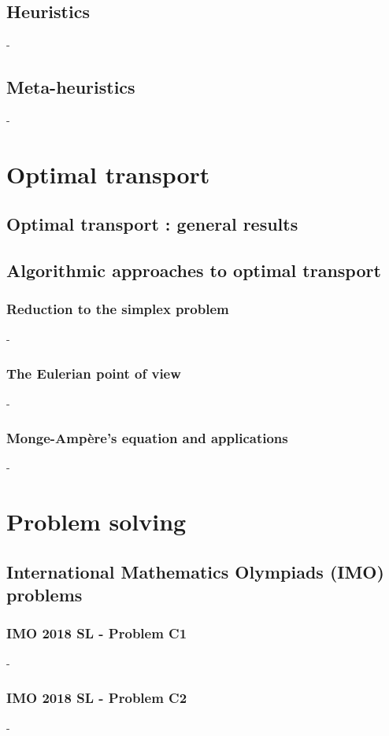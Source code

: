 \documentclass[12pt,openany,oneside]{book}
\theoremstyle{definition}
\numberwithin{definition}{section}
\numberwithin{theorem}{section}
\numberwithin{corollary}{section}
\numberwithin{proposition}{section}
\numberwithin{notation}{section}
\numberwithin{remark}{section}
\numberwithin{hypothesis}{section}
\numberwithin{example}{section}
\begin{document}
\chapter{Heuristics}\label{chap:heuristics}-
\chapter{Meta-heuristics}\label{chap:meta-heuristics}-

\part{Optimal transport}

\chapter{Optimal transport : general  results}

\chapter{Algorithmic approaches to optimal transport}

\section{Reduction to the simplex problem}-
\section{The Eulerian point of view}-
\section{Monge-Ampère's equation and applications}-

\part{Problem solving}

\chapter{International Mathematics Olympiads (IMO) problems}

\section{IMO 2018 SL - Problem C1}-
\section{IMO 2018 SL - Problem C2}-
\end{document}
